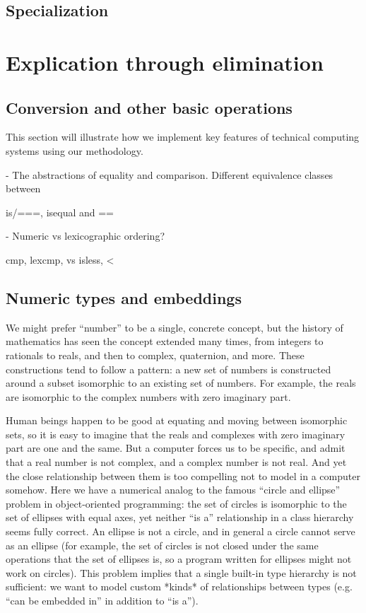 \subsection{Specialization}

\section{Explication through elimination}

\subsection{Conversion and other basic operations}

This section will illustrate how we implement key features of technical computing
systems using our methodology.

- The abstractions of equality and comparison. Different equivalence classes between

is/===, isequal and ==

- Numeric vs lexicographic ordering?

cmp, lexcmp, vs isless, <

\subsection{Numeric types and embeddings}

We might prefer ``number'' to be a single,
concrete concept, but the history of mathematics has seen the concept
extended many times, from integers to rationals to reals, and then to complex,
quaternion, and more. These constructions tend to follow a pattern: a new set
of numbers is constructed around a subset isomorphic to an existing set of
numbers. For example, the reals are isomorphic to the complex numbers with
zero imaginary part.

Human beings happen to be good at equating and moving between isomorphic sets,
so it is easy to imagine that the reals and complexes with zero imaginary
part are one and the same. But a computer forces us to be specific, and admit
that a real number is not complex, and a complex number is not real. And yet
the close relationship between them is too compelling not to model in a
computer somehow. Here we have a numerical analog to the famous ``circle and
ellipse'' problem in object-oriented programming: the set of circles is
isomorphic to the set of ellipses with equal axes, yet neither ``is a''
relationship in a class hierarchy seems fully correct. An ellipse is not
a circle, and in general a circle cannot serve as an ellipse (for example,
the set of circles is not closed under the same operations that the set of
ellipses is, so a program written for ellipses might not work on circles).
This problem implies that a single built-in type hierarchy is not
sufficient: we want to model custom *kinds* of relationships between
types (e.g. ``can be embedded in'' in addition to ``is a'').

